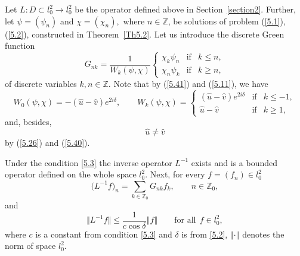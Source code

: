 Let $L:D\subset l_{0}^{2}\rightarrow l_{0}^{2}$ be the operator def\/ined
above in Section~\ref{section2}. Further, let $\psi =(\psi _{n})$ and $\chi
=(\chi _{n}),$ where $n\in
\mathbb{Z}
$, be solutions of problem (\ref{5.1}), (\ref{5.2}), constructed in Theorem~\ref{Th5.2}. Let us introduce the discrete Green function%
\begin{equation*}
G_{nk}=\frac{1}{W_{k}(\psi ,\chi )}\left\{
\begin{array}{lll}
\chi _{k}\psi _{n} & \text{if} & k\leq n, \\
\chi _{n}\psi _{k} & \text{if} & k\geq n,%
\end{array}%
\right. %
\end{equation*}%
of discrete variables $k,n\in
\mathbb{Z}
.$ Note that by (\ref{5.41}) and (\ref{5.11}), we have%
\begin{equation}
W_{0}(\psi ,\chi )=-(\widehat{u}-\widehat{v})e^{2i\delta },\qquad
W_{k}(\psi ,\chi )=\left\{
\begin{array}{lll}
(\widehat{u}-\widehat{v})e^{2i\delta } & \text{if} & k\leq -1, \\
\widehat{u}-\widehat{v} & \text{if} & k\geq 1,%
\end{array}%
\right.  \label{6.6}
\end{equation}%
and, besides,%
\begin{equation*}
\widehat{u}\neq \widehat{v}  %
\end{equation*}%
by (\ref{5.26}) and (\ref{5.40}).

\begin{theorem}
\label{Th6.1}Under the condition \eqref{5.3} the inverse operator $L^{-1}$
exists and is a bounded operator defined on the whole space $l_{0}^{2}.$
Next, for every $f=(f_{n})\in l_{0}^{2}$%
\begin{equation}
\big(L^{-1}f\big)_{n}=\sum_{k\in
\mathbb{Z}
_{0}}G_{nk}f_{k},\qquad n\in \mathbb{Z}
_{0},  \label{6.8}
\end{equation}%
and%
\begin{equation}
\big\Vert L^{-1}f\big\Vert \leq \frac{1}{c\cos \delta }\left\Vert
f\right\Vert \qquad \text{for all} \ \ f\in l_{0}^{2},  \label{6.9}
\end{equation}%
where $c$ is a constant from condition \eqref{5.3} and $\delta $ is from \eqref{5.2}, $\left\Vert \cdot \right\Vert $ denotes the norm of space $l_{0}^{2}.$
\end{theorem}

